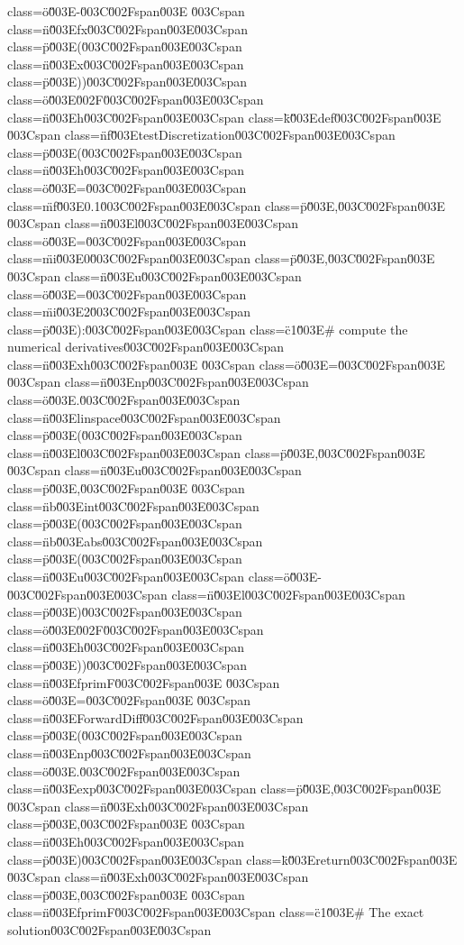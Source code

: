 class=\"o\"\u003E-\u003C\u002Fspan\u003E \u003Cspan class=\"n\"\u003Efx\u003C\u002Fspan\u003E\u003Cspan class=\"p\"\u003E(\u003C\u002Fspan\u003E\u003Cspan class=\"n\"\u003Ex\u003C\u002Fspan\u003E\u003Cspan class=\"p\"\u003E))\u003C\u002Fspan\u003E\u003Cspan class=\"o\"\u003E\u002F\u003C\u002Fspan\u003E\u003Cspan class=\"n\"\u003Eh\u003C\u002Fspan\u003E\n\n\u003Cspan class=\"k\"\u003Edef\u003C\u002Fspan\u003E \u003Cspan class=\"nf\"\u003EtestDiscretization\u003C\u002Fspan\u003E\u003Cspan class=\"p\"\u003E(\u003C\u002Fspan\u003E\u003Cspan class=\"n\"\u003Eh\u003C\u002Fspan\u003E\u003Cspan class=\"o\"\u003E=\u003C\u002Fspan\u003E\u003Cspan class=\"mf\"\u003E0.1\u003C\u002Fspan\u003E\u003Cspan class=\"p\"\u003E,\u003C\u002Fspan\u003E \u003Cspan class=\"n\"\u003El\u003C\u002Fspan\u003E\u003Cspan class=\"o\"\u003E=\u003C\u002Fspan\u003E\u003Cspan class=\"mi\"\u003E0\u003C\u002Fspan\u003E\u003Cspan class=\"p\"\u003E,\u003C\u002Fspan\u003E \u003Cspan class=\"n\"\u003Eu\u003C\u002Fspan\u003E\u003Cspan class=\"o\"\u003E=\u003C\u002Fspan\u003E\u003Cspan class=\"mi\"\u003E2\u003C\u002Fspan\u003E\u003Cspan class=\"p\"\u003E):\u003C\u002Fspan\u003E\n    \u003Cspan class=\"c1\"\u003E# compute the numerical derivatives\u003C\u002Fspan\u003E\n    \u003Cspan class=\"n\"\u003Exh\u003C\u002Fspan\u003E \u003Cspan class=\"o\"\u003E=\u003C\u002Fspan\u003E \u003Cspan class=\"n\"\u003Enp\u003C\u002Fspan\u003E\u003Cspan class=\"o\"\u003E.\u003C\u002Fspan\u003E\u003Cspan class=\"n\"\u003Elinspace\u003C\u002Fspan\u003E\u003Cspan class=\"p\"\u003E(\u003C\u002Fspan\u003E\u003Cspan class=\"n\"\u003El\u003C\u002Fspan\u003E\u003Cspan class=\"p\"\u003E,\u003C\u002Fspan\u003E \u003Cspan class=\"n\"\u003Eu\u003C\u002Fspan\u003E\u003Cspan class=\"p\"\u003E,\u003C\u002Fspan\u003E \u003Cspan class=\"nb\"\u003Eint\u003C\u002Fspan\u003E\u003Cspan class=\"p\"\u003E(\u003C\u002Fspan\u003E\u003Cspan class=\"nb\"\u003Eabs\u003C\u002Fspan\u003E\u003Cspan class=\"p\"\u003E(\u003C\u002Fspan\u003E\u003Cspan class=\"n\"\u003Eu\u003C\u002Fspan\u003E\u003Cspan class=\"o\"\u003E-\u003C\u002Fspan\u003E\u003Cspan class=\"n\"\u003El\u003C\u002Fspan\u003E\u003Cspan class=\"p\"\u003E)\u003C\u002Fspan\u003E\u003Cspan class=\"o\"\u003E\u002F\u003C\u002Fspan\u003E\u003Cspan class=\"n\"\u003Eh\u003C\u002Fspan\u003E\u003Cspan class=\"p\"\u003E))\u003C\u002Fspan\u003E\n    \u003Cspan class=\"n\"\u003EfprimF\u003C\u002Fspan\u003E \u003Cspan class=\"o\"\u003E=\u003C\u002Fspan\u003E \u003Cspan class=\"n\"\u003EForwardDiff\u003C\u002Fspan\u003E\u003Cspan class=\"p\"\u003E(\u003C\u002Fspan\u003E\u003Cspan class=\"n\"\u003Enp\u003C\u002Fspan\u003E\u003Cspan class=\"o\"\u003E.\u003C\u002Fspan\u003E\u003Cspan class=\"n\"\u003Eexp\u003C\u002Fspan\u003E\u003Cspan class=\"p\"\u003E,\u003C\u002Fspan\u003E \u003Cspan class=\"n\"\u003Exh\u003C\u002Fspan\u003E\u003Cspan class=\"p\"\u003E,\u003C\u002Fspan\u003E \u003Cspan class=\"n\"\u003Eh\u003C\u002Fspan\u003E\u003Cspan class=\"p\"\u003E)\u003C\u002Fspan\u003E\n    \u003Cspan class=\"k\"\u003Ereturn\u003C\u002Fspan\u003E \u003Cspan class=\"n\"\u003Exh\u003C\u002Fspan\u003E\u003Cspan class=\"p\"\u003E,\u003C\u002Fspan\u003E \u003Cspan class=\"n\"\u003EfprimF\u003C\u002Fspan\u003E\n\n\u003Cspan class=\"c1\"\u003E# The exact solution\u003C\u002Fspan\u003E\n\u003Cspan 
